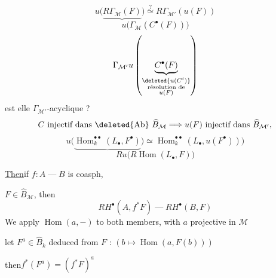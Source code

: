 \[
u\bigl(\underbrace{R\Gamma_{\mathcal M}(F)}\bigr)\overset{?}{\simeq}R\Gamma_{\mathcal M'}(u(F))
\]
\[
u\bigl(\Gamma_{\mathcal M}(C^\bullet(F))\bigr)
\]
\[
\Gamma_{\mathcal M'}u\left(\underbrace{C^\bullet(F)}_{\substack{\deleted{u(C^i)}\\\text{résolution de}\\u(F)}}\right)
\]
est elle $\Gamma_{\mathcal M'}$-acyclique ?
\[
C\text{ injectif dans }\deleted{\mathrm{Ab}}\ \widehat B_{\mathcal M}
\Longrightarrow u(F)\text{ injectif dans }\widehat B_{\mathcal M'},
\]
\[
u\bigl(\underbrace{\operatorname{Hom}^{\bullet\bullet}_k(L_\bullet,F^\bullet)}\bigr)
\simeq\operatorname{Hom}^{\bullet\bullet}_k(L_\bullet,u(F^\bullet)))
\]
\[
Ru\bigl(R\operatorname{Hom}(L_\bullet,F)\bigr)
\]

\quad\uline{Then}\qquad if $f:A\mathbin{\text{---}}B$ is coasph,

$F\in\widehat B_{\mathcal M}$, then
\[
RH^\bullet(A,f^*F)\mathbin{\text{---}}RH^\bullet(B,F)
\]
We apply $\operatorname{Hom}(a,-)$ to both members,
with $a$ projective in $\mathcal M$

 let $F^a\in\widehat B_k$ deduced from $F$ :
$(b\longmapsto\operatorname{Hom}(a,F(b)))$

then\qquad $f^*(F^a)=(f^*F)^a$
